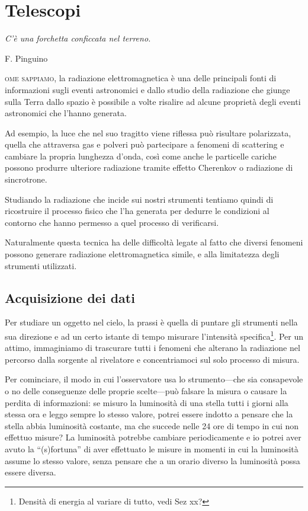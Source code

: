 \chapter{Telescopi}
    \epigraph{\itshape C'è una forchetta conficcata nel terreno.}{F. Pinguino}
    \noindent{}\textsc{ome sappiamo}, la radiazione elettromagnetica è una delle principali fonti di informazioni sugli eventi astronomici e dallo studio della radiazione che giunge sulla Terra dallo spazio è possibile a volte risalire ad alcune proprietà degli eventi astronomici che l'hanno generata.

    Ad esempio, la luce che nel suo tragitto viene riflessa può risultare polarizzata, quella che attraversa gas e polveri può partecipare a fenomeni di scattering e cambiare la propria lunghezza d'onda, così come anche le particelle cariche possono produrre ulteriore radiazione tramite effetto Cherenkov o radiazione di sincrotrone.

    Studiando la radiazione che incide sui nostri strumenti tentiamo quindi di ricostruire il processo fisico che l'ha generata per dedurre le condizioni al contorno che hanno permesso a quel processo di verificarsi.

    Naturalmente questa tecnica ha delle difficoltà legate al fatto che diversi fenomeni possono generare radiazione elettromagnetica simile, e alla limitatezza degli strumenti utilizzati.
    \section{Acquisizione dei dati}
        Per studiare un oggetto nel cielo, la prassi è quella di puntare gli strumenti nella sua direzione e ad un certo istante di tempo misurare l'intensità specifica\footnote{Densità di energia al variare di tutto, vedi Sez xx?}. Per un attimo, immaginiamo di trascurare tutti i fenomeni che alterano la radiazione nel percorso dalla sorgente al rivelatore e concentriamoci sul solo processo di misura.

        Per cominciare, il modo in cui l'osservatore usa lo strumento---che sia consapevole o no delle conseguenze delle proprie scelte---può falsare la misura o causare la perdita di informazioni: se misuro la luminosità di una stella tutti i giorni alla stessa ora e leggo sempre lo stesso valore, potrei essere indotto a pensare che la stella abbia luminosità costante, ma che succede nelle 24 ore di tempo in cui non effettuo misure? La luminosità potrebbe cambiare periodicamente e io potrei aver avuto la ``(s)fortuna'' di aver effettuato le misure in momenti in cui la luminosità assume lo stesso valore, senza pensare che a un orario diverso la luminosità possa essere diversa.

